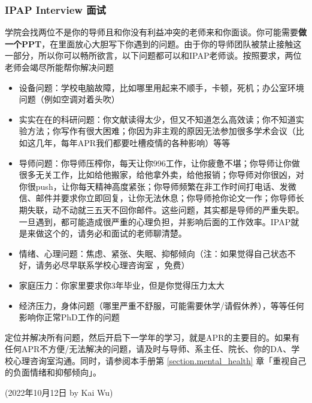 \subsubsection{IPAP Interview 面试}
\label{section:IPAP}
学院会找两位不是你的导师且和你没有利益冲突的老师来和你面谈。你可能需要\textbf{做一个PPT}，在里面放心大胆写下你遇到的问题。由于你的导师团队被禁止接触这一部分，所以你可以畅所欲言，以下问题都可以和IPAP老师谈。按照要求，两位老师会竭尽所能帮你解决问题
\begin{itemize}
    \item 设备问题：学校电脑故障，比如哪里用起来不顺手，卡顿，死机；办公室环境问题（例如空调对着头吹）
    \item 实实在在的科研问题：你文献读得太少，但又不知道怎么高效读；你不知道实验方法；你写作有很大困难；你因为非主观的原因无法参加很多学术会议（比如这几年，每年APR我们都要吐槽疫情的各种影响）等等
    \item 导师问题：你导师压榨你，每天让你996工作，让你疲惫不堪；你导师让你做很多无关工作，比如给他搬家，给他拿外卖，给他报销；你导师对你很凶，对你很push，让你每天精神高度紧张；你导师频繁在非工作时间打电话、发微信、邮件并要求你立即回复，让你无法休息；你导师抢你论文一作；你导师长期失联，动不动就三五天不回你邮件。这些问题，其实都是导师的严重失职。一旦遇到，都可能造成很严重的心理负担，并影响后面的工作效率。IPAP就是来做这个的，请务必和面试的老师聊清楚。
    \item 情绪、心理问题：焦虑、紧张、失眠、抑郁倾向（注：如果觉得自己状态不好，请务必尽早联系学校心理咨询室  ，免费）
    \item 家庭压力：你家里要求你3年毕业，但是你觉得压力太大
    \item 经济压力，身体问题（哪里严重不舒服，可能需要休学/请假休养），等等任何影响你正常PhD工作的问题
\end{itemize}

\vspace{5mm}
定位并解决所有问题，然后开启下一学年的学习，就是APR的主要目的。如果有任何APR不方便/无法解决的问题，请及时与导师、系主任、院长、你的DA、学校心理咨询室沟通。同时，请参阅本手册第 \ref{section.mental_health} 章「重视自己的负面情绪和抑郁倾向」。


\begin{flushright}
(2022年10月12日 by Kai Wu)
\end{flushright}